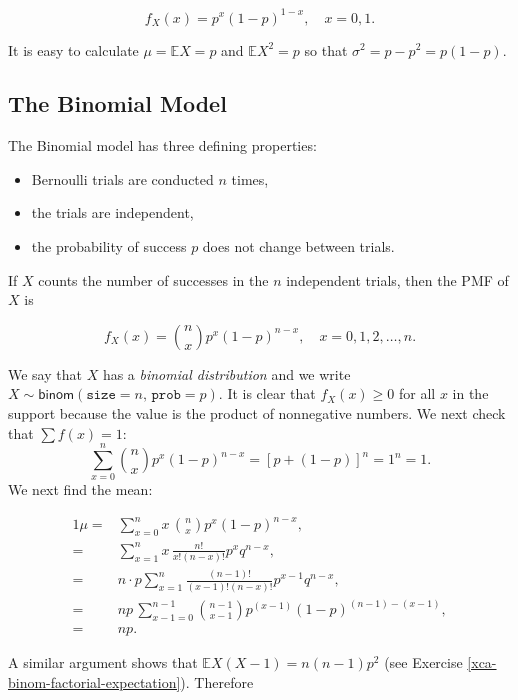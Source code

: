 \documentclass[]{book}
\providecommand{\tightlist}{%
  \setlength{\itemsep}{0pt}\setlength{\parskip}{0pt}}
\numberwithin{equation}{chapter}
\numberwithin{figure}{chapter}
\theoremstyle{plain}
\theoremstyle{definition}
\theoremstyle{remark}
\theoremstyle{definition}
\theoremstyle{definition}
\theoremstyle{remark}
\begin{document}
\begin{equation}
f_{X}(x)=p^{x}(1-p)^{1-x},\quad x=0,1.
\end{equation}

It is easy to calculate \(\mu=\mathbb{E} X=p\) and
\(\mathbb{E} X^{2}=p\) so that \(\sigma^{2}=p-p^{2}=p(1-p)\).

\subsection{The Binomial Model}\label{sub-the-binomial-model}

The Binomial model has three defining properties:

\begin{itemize}
\tightlist
\item
  Bernoulli trials are conducted \(n\) times,
\item
  the trials are independent,
\item
  the probability of success \(p\) does not change between trials.
\end{itemize}

If \(X\) counts the number of successes in the \(n\) independent trials,
then the PMF of \(X\) is

\begin{equation}
f_{X}(x)={n \choose x}p^{x}(1-p)^{n-x},\quad x=0,1,2,\ldots,n.
\end{equation}

We say that \(X\) has a \emph{binomial distribution} and we write
\(X\sim\mathsf{binom}(\mathtt{size}=n,\,\mathtt{prob}=p)\). It is clear
that \(f_{X}(x)\geq0\) for all \(x\) in the support because the value is
the product of nonnegative numbers. We next check that \(\sum f(x)=1\):
\[ \sum_{x = 0}^{n}{n \choose x} p^{x} (1 - p)^{n - x} =
[p + (1 - p)]^{n} = 1^{n} = 1.  \] We next find the mean:

\begin{alignat*}{1}
\mu= & \sum_{x=0}^{n}x\,{n \choose x}p^{x}(1-p)^{n-x},\\
= & \sum_{x=1}^{n}x\,\frac{n!}{x!(n-x)!}p^{x}q^{n-x},\\
= & n\cdot p\sum_{x=1}^{n}\frac{(n-1)!}{(x-1)!(n-x)!}p^{x-1}q^{n-x},\\
= & np\,\sum_{x-1=0}^{n-1}{n-1 \choose x-1}p^{(x-1)}(1-p)^{(n-1)-(x-1)},\\
= & np.
\end{alignat*}

A similar argument shows that \(\mathbb{E} X(X - 1) = n(n - 1)p^{2}\)
(see Exercise \ref{xca-binom-factorial-expectation}). Therefore
\end{document}
